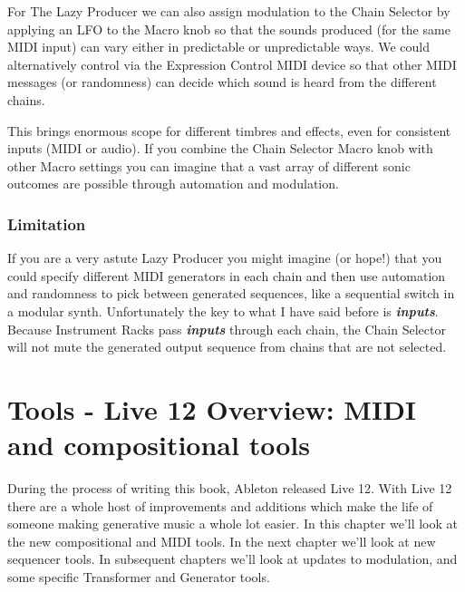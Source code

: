 \documentclass[
  12pt,
  letterpaper,
  oneside,
  open=any]{scrbook}
\makeatletter
\newcommand*\pandocbounded[1]{%
  \sbox\pandoc@box{#1}%
  \Gscale@div\@tempa{\textheight}{\dimexpr\ht\pandoc@box+\dp\pandoc@box\relax}%
  \Gscale@div\@tempb{\linewidth}{\wd\pandoc@box}%
  \ifdim\@tempb\p@<\@tempa\p@\let\@tempa\@tempb\fi%
  \ifdim\@tempa\p@<\p@\scalebox{\@tempa}{\usebox\pandoc@box}%
  \else\usebox{\pandoc@box}%
  \fi%
}
\makeatother
\begin{document}
\pandocbounded{\texttt{[image: images/Instrument\_Rack.png]}}

For The Lazy Producer we can also assign modulation to the Chain
Selector by applying an LFO to the Macro knob so that the sounds
produced (for the same MIDI input) can vary either in predictable or
unpredictable ways. We could alternatively control via the Expression
Control MIDI device so that other MIDI messages (or randomness) can
decide which sound is heard from the different chains.

This brings enormous scope for different timbres and effects, even for
consistent inputs (MIDI or audio). If you combine the Chain Selector
Macro knob with other Macro settings you can imagine that a vast array
of different sonic outcomes are possible through automation and
modulation.

\subsection{Limitation}\label{limitation}

If you are a very astute Lazy Producer you might imagine (or hope!) that
you could specify different MIDI generators in each chain and then use
automation and randomness to pick between generated sequences, like a
sequential switch in a modular synth. Unfortunately the key to what I
have said before is \textbf{\emph{inputs}}. Because Instrument Racks
pass \textbf{\emph{inputs}} through each chain, the Chain Selector will
not mute the generated output sequence from chains that are not
selected.


\chapter{Tools - Live 12 Overview: MIDI and compositional
tools}\label{Chapter-030-Tools-Live12_Intro}

During the process of writing this book, Ableton released Live 12. With
Live 12 there are a whole host of improvements and additions which make
the life of someone making generative music a whole lot easier. In this
chapter we'll look at the new compositional and MIDI tools. In the next
chapter we'll look at new sequencer tools. In subsequent chapters we'll
look at updates to modulation, and some specific Transformer and
Generator tools.
\end{document}
